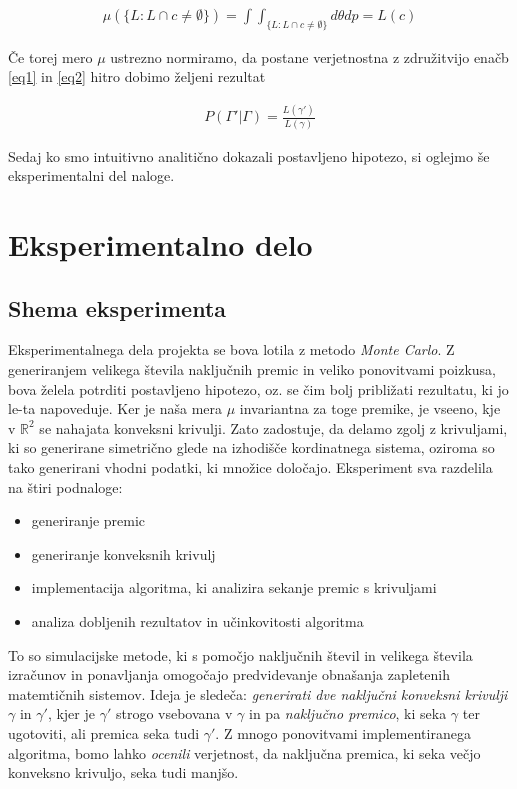 \documentclass[a4paper]{article}
\begin{document}
\begin{align}
\mu(\{L:L \cap c \ne \emptyset \}) = \int \int _{\{L:L \cap c \ne \emptyset \}} d\theta dp = L(c) \label{eq2}
\end{align}

Če torej mero $\mu$ ustrezno normiramo, da postane verjetnostna z združitvijo enačb  \ref{eq1} in \ref{eq2} hitro dobimo željeni rezultat

\begin{align}
P(\Gamma' | \Gamma) = \frac{L(\gamma')}{L(\gamma)}
\end{align}

Sedaj ko smo intuitivno analitično dokazali postavljeno hipotezo, si oglejmo še eksperimentalni del naloge.







\section{Eksperimentalno delo}

\subsection{Shema eksperimenta}

Eksperimentalnega dela projekta se bova lotila z metodo \textit{Monte Carlo}. Z generiranjem velikega števila naključnih premic in veliko ponovitvami poizkusa, bova želela potrditi postavljeno hipotezo, oz. se čim bolj približati rezultatu, ki jo le-ta napoveduje. Ker je naša mera $\mu$ invariantna za toge premike, je vseeno, kje v $\mathbb{R}^2$ se nahajata konveksni krivulji. Zato zadostuje, da delamo zgolj z krivuljami, ki so generirane simetrično glede na izhodišče kordinatnega sistema, oziroma so tako generirani vhodni podatki, ki množice določajo. Eksperiment sva razdelila na štiri podnaloge:

\begin{itemize}
\item generiranje premic
\item generiranje konveksnih krivulj
\item implementacija algoritma, ki analizira sekanje premic s krivuljami
\item analiza dobljenih rezultatov in učinkovitosti algoritma
\end{itemize}




To so simulacijske metode, ki s pomočjo naključnih števil in velikega števila izračunov in ponavljanja omogočajo predvidevanje obnašanja zapletenih matemtičnih sistemov. Ideja je sledeča: \textit{generirati dve naključni konveksni krivulji} $\gamma$ in $\gamma'$, kjer je $\gamma'$ strogo vsebovana v $\gamma$ in pa \textit{naključno premico}, ki seka $\gamma$ ter ugotoviti, ali premica seka tudi $\gamma'$. Z mnogo ponovitvami implementiranega algoritma, bomo lahko \textit{ocenili} verjetnost, da naključna premica, ki seka večjo konveksno krivuljo, seka tudi manjšo.
\end{document}
